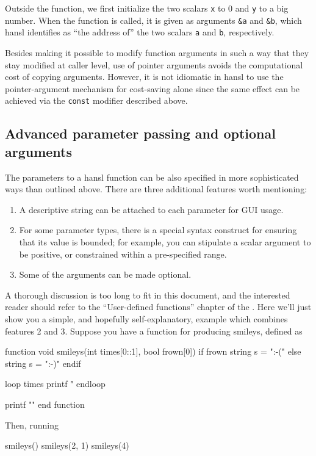 Outside the function, we first initialize the two scalars \texttt{x}
to 0 and \texttt{y} to a big number. When the function is called, it
is given as arguments \verb|&a| and \verb|&b|, which hansl identifies
as ``the address of'' the two scalars \texttt{a} and \texttt{b},
respectively.

Besides making it possible to modify function arguments in such a way
that they stay modified at caller level, use of pointer arguments
avoids the computational cost of copying arguments. However, it is not
idiomatic in hansl to use the pointer-argument mechanism for
cost-saving alone since the same effect can be achieved via the
\texttt{const} modifier described above.

\subsection{Advanced parameter passing and optional arguments}

The parameters to a hansl function can be also specified in more
sophisticated ways than outlined above. There are three additional
features worth mentioning:
\begin{enumerate}
\item A descriptive string can be attached to each parameter for GUI usage.
\item For some parameter types, there is a special syntax construct
  for ensuring that its value is bounded; for example, you can
  stipulate a scalar argument to be positive, or constrained within a
  pre-specified range.
\item Some of the arguments can be made optional.
\end{enumerate}

A thorough discussion is too long to fit in this document, and the
interested reader should refer to the ``User-defined functions''
chapter of the \GUG. Here we'll just show you a simple, and hopefully
self-explanatory, example which combines features 2 and 3. Suppose
you have a function for producing smileys, defined as
\begin{code}
function void smileys(int times[0::1], bool frown[0])
    if frown
        string s = ":-("
    else
        string s = ":-)"
    endif

    loop times
        printf "%
    endloop

    printf "\n"
end function
\end{code}

Then, running
\begin{code}
smileys()
smileys(2, 1)
smileys(4)
\end{code}


